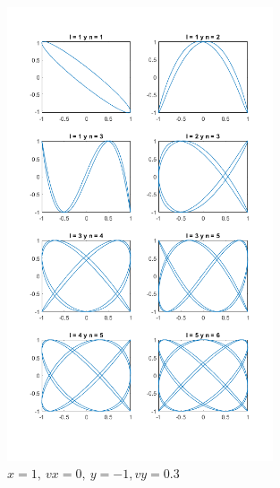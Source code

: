\documentclass{article}
\begin{document}
\begin{figure}[H]
\centering
    \includegraphics[width=0.7\textwidth]{images/02D.png}
    \caption{$x = 1,~vx = 0,~y = -1, vy = 0.3$}
\end{figure}
\end{document}
